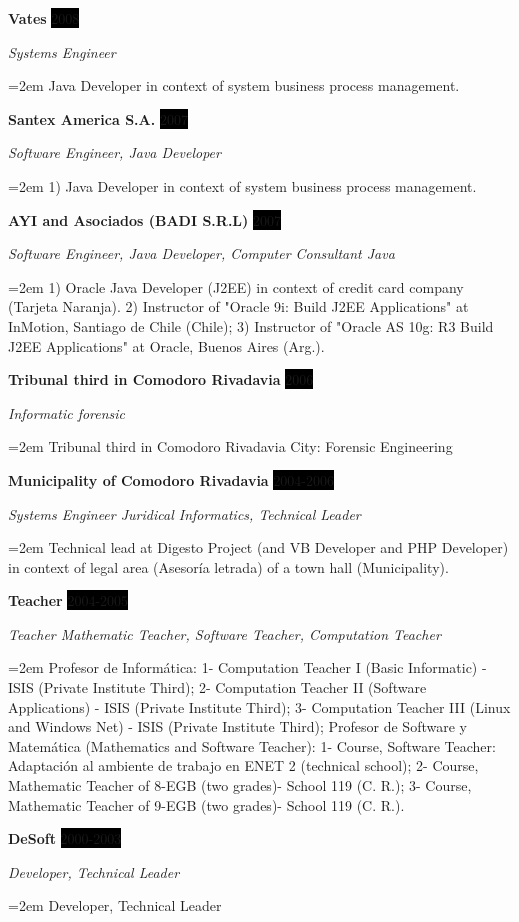 \documentclass[paper=a4,fontsize=11pt]{scrartcl} %
\newcommand{\sepspace}{\vspace*{1em}}		%
\newcommand{\EducationEntry}[4]{ %
		\noindent \textbf{#1} \hfill      %
		\colorbox{Black}{%
			\parbox{6em}{%
			\hfill\color{White}#2}} \par  %
		\noindent \textit{#3} \par        %
		\noindent\hangindent=2em\hangafter=0 \small #4 %
		\normalsize \par}
\newcommand{\WorkEntry}[4]{				  %
		\noindent \textbf{#1} \hfill      %
		\colorbox{Black}{\color{White}#2} \par  %
		\noindent \textit{#3} \par              %
		\noindent\hangindent=2em\hangafter=0 \small #4 %
		\normalsize \par}
\begin{document}
\WorkEntry{Vates}{2008}{Systems Engineer}
{Java Developer in context of system business process management.}
\sepspace

\WorkEntry{Santex America S.A.}{2007}{Software Engineer, Java Developer}
{1) Java Developer in context of system business process management.}
\sepspace

\WorkEntry{AYI and Asociados (BADI S.R.L)}{2007}{Software Engineer, Java Developer, Computer Consultant Java}
{1) Oracle Java Developer (J2EE) in context of credit card company (Tarjeta Naranja).
2) Instructor of "Oracle 9i: Build J2EE Applications" at InMotion, Santiago de Chile (Chile);
3) Instructor of "Oracle AS 10g: R3 Build J2EE Applications" at Oracle, Buenos Aires (Arg.).}
\sepspace

\WorkEntry{Tribunal third in Comodoro Rivadavia}{2006}{Informatic forensic}{
Tribunal third in Comodoro Rivadavia City: Forensic Engineering}
\sepspace

\WorkEntry{Municipality of Comodoro Rivadavia}{2004-2006}{Systems Engineer Juridical Informatics, Technical Leader}
{Technical lead at Digesto Project (and VB Developer and PHP Developer) in context of legal area (Asesoría letrada) of a town hall (Municipality).}
\sepspace

\WorkEntry{Teacher}{2004-2005}{Teacher Mathematic Teacher, Software Teacher, Computation Teacher}
{Profesor de Informática: 1- Computation Teacher I (Basic Informatic) - ISIS (Private Institute Third); 2- Computation Teacher II (Software Applications) - ISIS (Private Institute Third); 3- Computation Teacher III (Linux and Windows Net) - ISIS (Private Institute Third); Profesor de Software y Matemática (Mathematics and Software Teacher): 1- Course, Software Teacher: Adaptación al ambiente de trabajo en ENET 2 (technical school); 2- Course, Mathematic Teacher of 8-EGB  (two grades)- School 119 (C. R.); 3- Course, Mathematic Teacher of 9-EGB (two grades)- School 119 (C. R.).
}
\sepspace

\WorkEntry{DeSoft}{2000-2003}{Developer, Technical Leader}{
Developer, Technical Leader}
\sepspace
\end{document}

